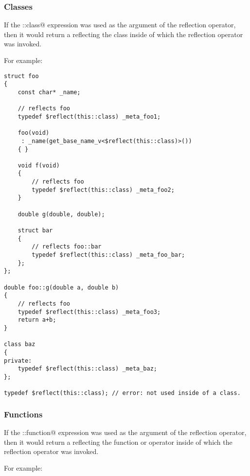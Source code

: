 \subsubsection{Classes}

If the \verb@this::class@ expression was used as the argument of the reflection
operator, then it would return a  reflecting the class
inside of which the reflection operator was invoked.

For example:

\begin{verbatim}
struct foo
{
	const char* _name;

	// reflects foo
	typedef $reflect(this::class) _meta_foo1;

	foo(void)
	 : _name(get_base_name_v<$reflect(this::class)>())
	{ }

	void f(void)
	{
		// reflects foo
		typedef $reflect(this::class) _meta_foo2;
	}

	double g(double, double);

	struct bar
	{
		// reflects foo::bar
		typedef $reflect(this::class) _meta_foo_bar;
	};
};

double foo::g(double a, double b)
{
	// reflects foo
	typedef $reflect(this::class) _meta_foo3;
	return a+b;
}

class baz
{
private:
	typedef $reflect(this::class) _meta_baz;
};

typedef $reflect(this::class); // error: not used inside of a class.

\end{verbatim}

\subsubsection{Functions}

If the \verb@this::function@ expression was used as the argument of the reflection
operator, then it would return a  reflecting the function or operator
inside of which the reflection operator was invoked.

For example:

